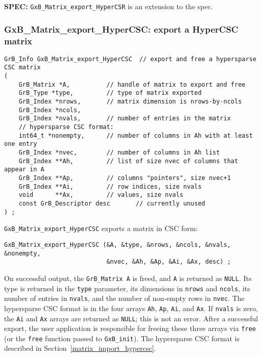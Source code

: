 \documentclass[12pt]{article}
\begin{document}
\begin{spec}
{\bf SPEC:} \verb'GxB_Matrix_export_HyperCSR' is an extension to the spec.
\end{spec}

\newpage
\subsubsection{{\sf GxB\_Matrix\_export\_HyperCSC:} export a HyperCSC matrix}
\label{matrix_export_hypercsc}

\begin{mdframed}[userdefinedwidth=6in]
{\footnotesize
\begin{verbatim}
GrB_Info GxB_Matrix_export_HyperCSC  // export and free a hypersparse CSC matrix
(
    GrB_Matrix *A,          // handle of matrix to export and free
    GrB_Type *type,         // type of matrix exported
    GrB_Index *nrows,       // matrix dimension is nrows-by-ncols
    GrB_Index *ncols,
    GrB_Index *nvals,       // number of entries in the matrix
    // hypersparse CSC format:
    int64_t *nonempty,      // number of columns in Ah with at least one entry
    GrB_Index *nvec,        // number of columns in Ah list
    GrB_Index **Ah,         // list of size nvec of columns that appear in A
    GrB_Index **Ap,         // columns "pointers", size nvec+1
    GrB_Index **Ai,         // row indices, size nvals
    void      **Ax,         // values, size nvals
    const GrB_Descriptor desc       // currently unused
) ;
\end{verbatim}
} \end{mdframed}

\verb'GxB_Matrix_export_HyperCSC' exports a matrix in CSC form:

{\footnotesize
\begin{verbatim}
GxB_Matrix_export_HyperCSC (&A, &type, &nrows, &ncols, &nvals, &nonempty,
                            &nvec, &Ah, &Ap, &Ai, &Ax, desc) ; \end{verbatim}}

\vspace{-0.05in}
On successful output, the \verb'GrB_Matrix A' is freed, and \verb'A' is
returned as \verb'NULL'.  Its type is returned in the \verb'type' parameter,
its dimensions in \verb'nrows' and \verb'ncols', its number of entries in
\verb'nvals', and the number of non-empty rows in \verb'nvec'.  The hypersparse
CSC format is in the four arrays \verb'Ah', \verb'Ap', \verb'Ai', and
\verb'Ax'.  If \verb'nvals' is zero, the \verb'Ai' and \verb'Ax' arrays are
returned as \verb'NULL'; this is not an error.  After a successful export, the
user application is responsible for freeing these three arrays via
\verb'free' (or the \verb'free' function passed to \verb'GxB_init').  The hypersparse CSC format is described in
Section~\ref{matrix_import_hypercsc}.
\end{document}
